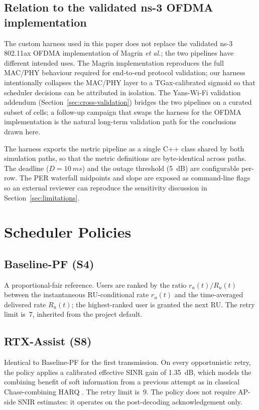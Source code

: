 \documentclass[journal,onecolumn,11pt,a4paper]{IEEEtran}
\begin{document}
\subsection{Relation to the validated ns-3 OFDMA implementation}
\label{sec:relation-mag21}

The custom harness used in this paper does not replace the validated
ns-3 802.11ax OFDMA implementation of Magrin \emph{et al.}\xspace \cite{Mag21};
the two pipelines have different intended uses. The Magrin
implementation reproduces the full MAC/PHY behaviour required for
end-to-end protocol validation; our harness intentionally collapses
the MAC/PHY layer to a TGax-calibrated sigmoid so that scheduler
decisions can be attributed in isolation. The Yans-Wi-Fi validation
addendum (Section~\ref{sec:cross-validation}) bridges the two
pipelines on a curated subset of cells; a follow-up campaign that
swaps the harness for the \cite{Mag21} OFDMA implementation is the
natural long-term validation path for the conclusions drawn here.

The harness exports the metric pipeline as a single C++ class shared by
both simulation paths, so that the metric definitions are byte-identical
across paths. The deadline ($D = \SI{10}{ms}$) and the outage threshold
(\SI{5}{dB}) are configurable per-row. The PER waterfall midpoints and
slope are exposed as command-line flags so an external reviewer can
reproduce the sensitivity discussion in
Section~\ref{sec:limitations}.

\section{Scheduler Policies}
\label{sec:policies}

\subsection{Baseline-PF (S4)}
A proportional-fair reference. Users are ranked by the ratio
$r_u(t)/R_u(t)$ between the instantaneous RU-conditional rate
$r_u(t)$ and the time-averaged delivered rate $R_u(t)$; the
highest-ranked user is granted the next RU. The retry limit is~7,
inherited from the project default.

\subsection{RTX-Assist (S8)}
Identical to Baseline-PF for the first transmission. On every
opportunistic retry, the policy applies a calibrated effective SINR
gain of \SI{1.35}{dB}, which models the combining benefit of soft
information from a previous attempt as in classical Chase-combining
HARQ \cite{Tan09}. The retry limit is~9. The policy does not require
AP-side SNIR estimates: it operates on the post-decoding
acknowledgement only.
\end{document}
